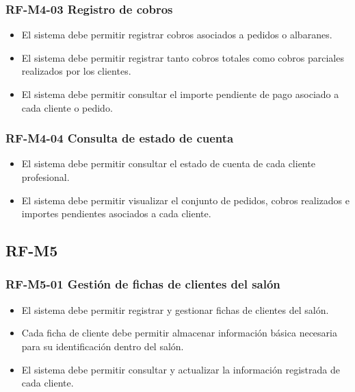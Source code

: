 \vspace{-0.75em}
\subsubsection{RF-M4-03 Registro de cobros}
\vspace{-1em}

\begin{itemize}
    \item El sistema debe permitir registrar cobros asociados a pedidos o albaranes.
    \item El sistema debe permitir registrar tanto cobros totales como cobros parciales realizados por los clientes.
    \item El sistema debe permitir consultar el importe pendiente de pago asociado a cada cliente o pedido.
\end{itemize}

\vspace{-0.75em}
\subsubsection{RF-M4-04 Consulta de estado de cuenta}
\vspace{-1em}

\begin{itemize}
    \item El sistema debe permitir consultar el estado de cuenta de cada cliente profesional.
    \item El sistema debe permitir visualizar el conjunto de pedidos, cobros realizados e importes pendientes asociados a cada cliente.
\end{itemize}

\subsection{RF-M5}

\vspace{-0.75em}
\subsubsection{RF-M5-01 Gestión de fichas de clientes del salón}
\vspace{-1em}

\begin{itemize}
    \item El sistema debe permitir registrar y gestionar fichas de clientes del salón.
    \item Cada ficha de cliente debe permitir almacenar información básica necesaria para su identificación dentro del salón.
    \item El sistema debe permitir consultar y actualizar la información registrada de cada cliente.
\end{itemize}

